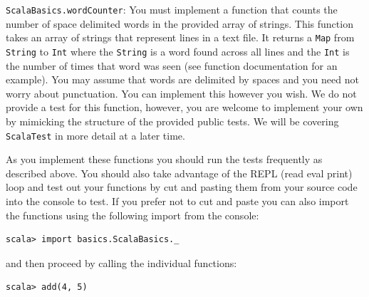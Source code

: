 \documentclass[12pt,a4paper]{exam}
\begin{document}
\begin{questions}
\question
\verb!ScalaBasics.wordCounter!: 
You must implement a function that counts the number of space delimited words in the provided array of 
strings. This function takes an array of strings that represent lines in a text file. 
It returns a \verb!Map! from \verb!String! to \verb!Int! where the \verb!String! 
is a word found across all lines and the \verb!Int! is the number of times that word was seen 
(see function documentation for an example). 
You may assume that words are delimited by spaces and you need not worry about punctuation. 
You can implement this however you wish. We do not provide a test for this function, however, 
you are welcome to implement your own by mimicking the structure of the provided public tests. 
We will be covering \verb!ScalaTest! in more detail at a later time.

\end{questions}
As you implement these functions you should run the tests frequently as described above. 
You should also take advantage of the REPL (read eval print) loop and test out your functions by cut and 
pasting them from your source code into the console to test. If you prefer not to cut and paste you can 
also import the functions using the following import from the console:
\begin{Verbatim}
scala> import basics.ScalaBasics._	
\end{Verbatim}
and then proceed by calling the individual functions:
\begin{Verbatim}
scala> add(4, 5)	
\end{Verbatim}
\end{document}
